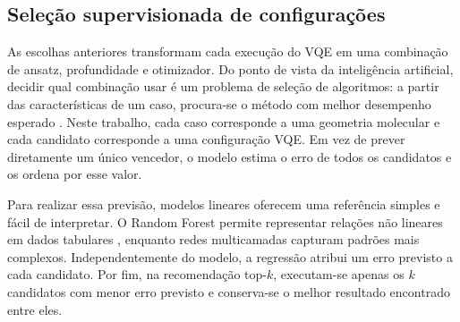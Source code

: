 \subsection{Seleção supervisionada de configurações}

As escolhas anteriores transformam cada execução do VQE em uma combinação de
ansatz, profundidade e otimizador. Do ponto de vista da inteligência artificial,
decidir qual combinação usar é um problema de seleção de algoritmos: a partir
das características de um caso, procura-se o método com melhor desempenho
esperado \cite{rice1976algorithm}. Neste trabalho, cada caso corresponde a uma
geometria molecular e cada candidato corresponde a uma configuração VQE. Em vez
de prever diretamente um único vencedor, o modelo estima o erro de todos os
candidatos e os ordena por esse valor.

Para realizar essa previsão, modelos lineares oferecem uma referência simples e
fácil de interpretar. O Random Forest permite representar relações não lineares
em dados tabulares \cite{breiman2001random}, enquanto redes multicamadas capturam
padrões mais complexos. Independentemente
do modelo, a regressão atribui um erro previsto a cada candidato. Por fim, na
recomendação top-$k$, executam-se apenas os $k$ candidatos com menor erro
previsto e conserva-se o melhor resultado encontrado entre eles.